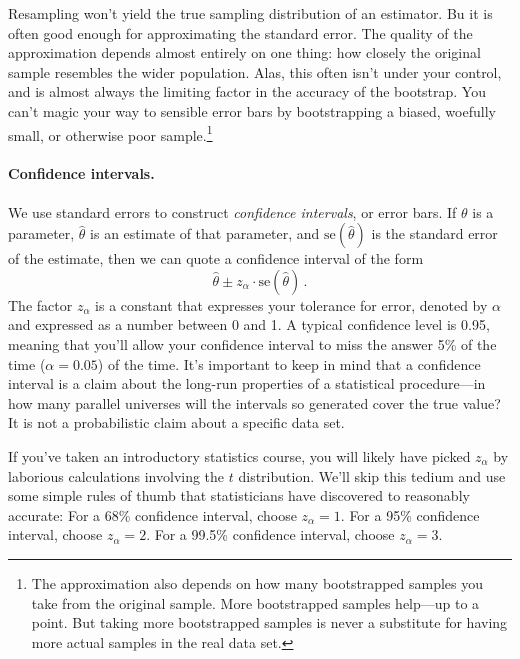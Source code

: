 \documentclass[11pt]{article}
\newcommand{\1}[1]{\mathbf{1}_{\{ {#1} \}}}
\begin{document}
Resampling won't yield the true sampling distribution of an estimator.  Bu it is often good enough for approximating the standard error.  The quality of the approximation depends almost entirely on one thing: how closely the original sample resembles the wider population.   Alas, this often isn't under your control, and is almost always the limiting factor in the accuracy of the bootstrap.  You can't magic your way to sensible error bars by bootstrapping a biased, woefully small, or otherwise poor sample.\footnote{The approximation also depends on how many bootstrapped samples you take from the original sample.  More bootstrapped samples help---up to a point.  But taking more bootstrapped samples is never a substitute for having more actual samples in the real data set.}


\paragraph{Confidence intervals.} We use standard errors to construct \textit{confidence intervals}, or error bars.  If $\theta$ is a parameter, $\hat{\theta}$ is an estimate of that parameter, and $\mbox{se}(\hat{\theta})$ is the standard error of the estimate, then we can quote a confidence interval of the form
$$
\hat{\theta} \pm z_{\alpha} \cdot \mbox{se}(\hat{\theta}) \, .
$$
The factor $z_{\alpha}$ is a constant that expresses your tolerance for error, denoted by $\alpha$ and expressed as a number between 0 and 1.  A typical confidence level is 0.95, meaning that you'll allow your confidence interval to miss the answer 5\% of the time ($\alpha = 0.05$)  of the time.  It's important to keep in mind that a confidence interval is a claim about the long-run properties of a statistical procedure---in how many parallel universes will the intervals so generated cover the true value?  It is not a probabilistic claim about a specific data set.

If you've taken an introductory statistics course, you will likely have picked $z_\alpha$ by laborious calculations involving the $t$ distribution.  We'll skip this tedium and use some simple rules of thumb that statisticians have discovered to reasonably accurate:  For a 68\% confidence interval, choose $z_\alpha = 1$.  For a 95\% confidence interval, choose $z_{\alpha} = 2$.  For a 99.5\% confidence interval, choose $z_{\alpha} = 3$.
\end{document}

